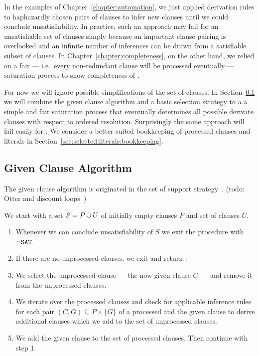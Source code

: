 In the examples of Chapter~\ref{chapter:automation},
we just applied derivation rules
to haphazardly chosen pairs of clauses
to infer new clauses
until we could conclude unsatisfiability.
%
In practice, such an approach may fail for an unsatisfiable set of clauses
simply because an important clause pairing is overlooked
and an infinite number of inferences can be drawn
from a satisfiable subset of clauses.
%
In Chapter~\ref{chapter:completeness}, on the other hand,
we relied on a fair ---
i.e.\ every non-redundant clause will be processed eventually ---
saturation process to show completeness of \InstGenEQ{}.

For now we will ignore possible simplifications of the set of clauses.
In Section~\ref{sec:given:clause:algorithm}
we will combine the given clause algorithm
and a basic selection strategy to a a simple and fair saturation process
that eventually determines all possible derivate clauses
with respect to ordered resolution.
Surprisingly the same approach will fail easily for \InstGen{}.
We consider a better suited bookkeeping of processed clauses and literals
in Section~\ref{sec:selected:literals:bookkeeping}.



\subsection{Given Clause Algorithm}\label{sec:given:clause:algorithm}

The given clause algorithm is originated in the set of support strategy~\cite{Wos:1965:ECS:321296.321302}. (todo: Otter and discount loops~\cite{DBLP:conf/cade/SchulzM16})

\begin{procedure}\label{proc:given:clause:algorithm}
	We start with a set \( S = P \mathbin{\dot\cup} U \)
	of initially empty  clauses \( P \)
	and set of  clauses \( U \).
	\begin{enumerate}
		\item[\jek] Whenever we can conclude unsatisfiability of \( S \)
		we exit the procedure with \( \lnot\texttt{SAT} \).
		\setcounter{enumi}{0}
		\item If there are no unprocessed clauses,
		we exit and return \SAT{}.
		\item We select the  unprocessed clause --- the now given clause \( G  \) --- and remove it from the unprocessed clauses. \hfill\jek{}
		\item We iterate over the processed clauses and check for applicable inference rules
		for each pair \( (C, G) \subseteq P \times \{ G \} \) of a processed and the given clause
		to derive additional clauses which we add to the set of unprocessed clauses. \hfill\jek{}
		\item We add the given clause to the set of processed clauses.
		Then continue with step 1.
	\end{enumerate}
\end{procedure}

